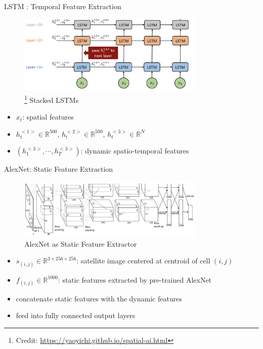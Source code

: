 \documentclass[10pt]{beamer}
\begin{document}
\begin{frame}{LSTM : Temporal Feature Extraction}
\begin{figure}
  \centering
    \includegraphics[width=0.8\textwidth]{Stacked_LSTMs.png}
    \caption{\footnote{Credit: \url{https://yaoyichi.github.io/spatial-ai.html}} Stacked LSTMs \citep{hochreiter1997long}}
\end{figure}
\begin{itemize}
    \item $x_t$: spatial features
    \item $h_t^{<1>}\in \mathbb{R}^{500}$, $h_t^{<2>}\in \mathbb{R}^{500}$, $h_t^{<3>}\in \mathbb{R}^{N}$
    \item $(h_1^{<3>}, \cdots, h_T^{<3>})$: dynamic spatio-temporal features
\end{itemize}
\end{frame}

\begin{frame}{AlexNet: Static Feature Extraction}
\begin{figure}
  \centering
    \includegraphics[width=0.8\textwidth]{AlexNet.png}
    \caption{AlexNet \citep{krizhevsky2012imagenet} as Static Feature Extractor}
\end{figure}
\begin{itemize}
    \item $s_{(i,j)}\in\mathbb{R}^{3\times 256\times256}$: satellite image centered at centroid of cell $(i,j)$
    \item $f_{(i,j)}\in\mathbb{R}^{1000}$: static features extracted by pre-trained AlexNet
    \item concatenate static features with the dynamic features
    \item feed into fully connected output layers
\end{itemize}
\end{frame}
\end{document}
